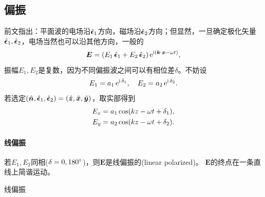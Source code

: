 \subsection{偏振}
前文指出：平面波的电场沿$\uvec\epsilon_1$方向，磁场沿$\uvec\epsilon_2$方向；但显然，一旦确定极化矢量$\uvec\epsilon_1,\uvec\epsilon_2$，电场当然也可以沿其他方向，一般的
\[
    \bm E=(E_1\uvec\epsilon_1+E_2\uvec\epsilon_2)\e{\i(\bm k\cdot\bm x-\omega t)},
\]
振幅$E_1,E_2$是复数，因为不同偏振波之间可以有相位差$\delta$。不妨设
\[
    E_1=a_1\e{\i\vd_1},\quad E_2=a_2\e{\i\vd_2}.
\]
若选定$(\uvec n,\uvec\epsilon_1,\uvec\epsilon_2)=(\uvec z,\uvec x,\uvec y)$，取实部得到
\begin{align*}
    E_x&=a_1\cos(kz-\omega t+\vd_1),\\
    E_y&=a_2\cos(kz-\omega t+\vd_2).
\end{align*}
\paragraph{线偏振}
若$E_1,E_2$同相($\vd=0,180\degree$)，则$\bm E$是线偏振的(linear polarized)。%
$\bm E$的终点在一条直线上简谐运动。
\begin{center}
	\tikzchap 线偏振
\end{center}
